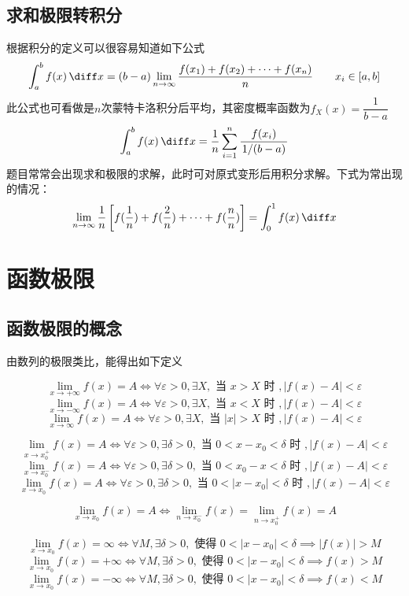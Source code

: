 \subsection{求和极限转积分}
根据积分的定义可以很容易知道如下公式
\[
    \int_{a}^{b} f(x) \,\diff x = (b-a)\lim_{n\to\infty}\frac{f(x_1) + f(x_2)+\cdots+f(x_n)}{n}\qquad x_i\in[a,b]
\]
此公式也可看做是$n$次蒙特卡洛积分后平均，其密度概率函数为$f_X(x)=\dfrac{1}{b-a}$
\[
    \int_a^b f(x) \,\diff x = \frac{1}{n}\sum_{i=1}^n \frac{f(x_i)}{\left.1\middle/(b-a)\right.}
\]
题目常常会出现求和极限的求解，此时可对原式变形后用积分求解。下式为常出现的情况：
\[
    \lim_{n\to\infty}\frac{1}{n}\left[f(\frac{1}{n}) + f(\frac{2}{n}) + \cdots + f(\frac{n}{n})\right] = \int_0^1 f(x) \,\diff x
\]


\section{函数极限}
\subsection{函数极限的概念}
由数列的极限类比，能得出如下定义
\begin{definition}
    \[ \lim_{x\to+\infty} f(x) = A \iff \forall\varepsilon >0, \exists X, \text{ 当~} x > X\text{ 时~}, \left\lvert f(x) - A \right\rvert < \varepsilon \]
    \[ \lim_{x\to-\infty} f(x) = A \iff \forall\varepsilon >0, \exists X, \text{ 当~} x < X\text{ 时~}, \left\lvert f(x) - A \right\rvert < \varepsilon \]
    \[ \lim_{x\to\infty}  f(x) = A \iff \forall\varepsilon >0, \exists X, \text{ 当~} \lvert x \rvert > X\text{ 时~}, \left\lvert f(x) - A \right\rvert < \varepsilon \]

    \[ \lim_{x\to x_0^+} f(x) = A \iff \forall\varepsilon > 0, \exists \delta > 0, \text{ 当~} 0 < x - x_0 < \delta \text{ 时~}, \left\lvert f(x) - A \right\rvert < \varepsilon \]
    \[ \lim_{x\to x_0^-} f(x) = A \iff \forall\varepsilon > 0, \exists \delta > 0, \text{ 当~} 0 < x_0 - x < \delta \text{ 时~}, \left\lvert f(x) - A \right\rvert < \varepsilon \]
    \[ \lim_{x\to x_0}   f(x) = A \iff \forall\varepsilon > 0, \exists \delta > 0, \text{ 当~} 0 < \lvert x-x_0 \rvert < \delta \text{ 时~}, \left\lvert f(x) - A \right\rvert < \varepsilon \]

    \[  \lim_{x\to x_0}  f(x) = A \iff \lim_{n\to x_0^-} f(x) = \lim_{n\to x_0^+} f(x) = A \]

    \[ \lim_{x\to x_0} f(x) = \infty \iff \forall M, \exists \delta > 0, \text{ 使得~} 0 < \lvert x-x_0 \rvert < \delta \implies \left\lvert f(x) \right\rvert > M \]
    \[ \lim_{x\to x_0} f(x) = +\infty \iff \forall M, \exists \delta > 0, \text{ 使得~} 0 < \lvert x-x_0 \rvert < \delta \implies f(x) > M \]
    \[ \lim_{x\to x_0} f(x) = -\infty \iff \forall M, \exists \delta > 0, \text{ 使得~} 0 < \lvert x-x_0 \rvert < \delta \implies f(x) < M \]
\end{definition}


